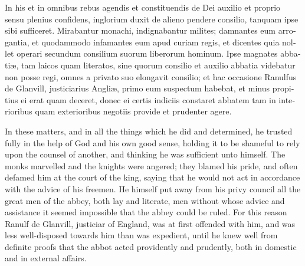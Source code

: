 \documentclass{book}
\begin{document}
\begin{paracol}{2}
\switchcolumn*

\begin{otherlanguage}{latin}
In his et in omnibus rebus agendis et constituendis de Dei auxilio et proprio sensu plenius confidens, inglorium duxit de alieno pendere consilio, tanquam ipse sibi sufficeret. Mirabantur monachi, indignabantur milites; damnantes eum arrogantia, et quodammodo infamantes eum apud curiam regis, et dicentes quia nollet operari secundum consilium suorum liberorum hominum. Ipse magnates abbati\ae{}, tam laicos quam literatos, sine quorum consilio et auxilio abbatia videbatur non posse regi, omnes a privato suo elongavit consilio; et hac occasione Ranulfus de Glanvill, justiciarius Angli\ae{}, primo eum suspectum habebat, et minus propitius ei erat quam deceret, donec ei certis indiciis constaret abbatem tam in interioribus quam exterioribus negotiis provide et prudenter agere.
\end{otherlanguage}

\switchcolumn

In these matters, and in all the things which he did and determined, he trusted fully in the help of God and his own good sense, holding it to be shameful to rely upon the counsel of another, and thinking he was sufficient unto himself. The monks marvelled and the knights were angered; they blamed his pride, and often defamed him at the court of the king, saying that he would not act in accordance with the advice of his freemen. He himself put away from his privy council all the great men of the abbey, both lay and literate, men without whose advice and assistance it seemed impossible that the abbey could be ruled. For this reason Ranulf de Glanvill, justiciar of England, was at first offended with him, and was less well-disposed towards him than was expedient, until he knew well from definite proofs that the abbot acted providently and prudently, both in domestic and in external affairs.

\switchcolumn*


\end{paracol}
\end{document}
